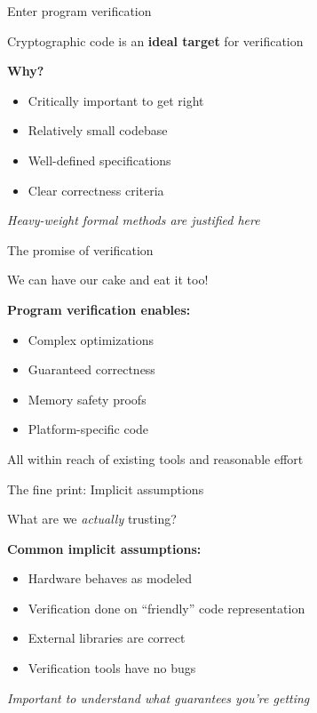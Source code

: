 \documentclass[aspectratio=169, lualatex, handout]{beamer}
\begin{document}
\begin{frame}{Enter program verification}
	\begin{center}
		\Large
		Cryptographic code is an \textbf{ideal target} for verification
	\end{center}
	\vspace{1em}
	\textbf{Why?}
	\begin{itemize}
		\item Critically important to get right
		\item Relatively small codebase
		\item Well-defined specifications
		\item Clear correctness criteria
	\end{itemize}
	\vspace{0.5em}
	\begin{center}
		\textit{Heavy-weight formal methods are justified here}
	\end{center}
\end{frame}

\begin{frame}{The promise of verification}
	\begin{center}
		\Large
		We can have our cake and eat it too!
	\end{center}
	\vspace{1em}
	\textbf{Program verification enables:}
	\begin{itemize}
		\item Complex optimizations
		\item Guaranteed correctness
		\item Memory safety proofs
		\item Platform-specific code
	\end{itemize}
	\vspace{0.5em}
	\begin{center}
		All within reach of existing tools and reasonable effort
	\end{center}
\end{frame}

\begin{frame}{The fine print: Implicit assumptions}
	\begin{center}
		\Large
		What are we \textit{actually} trusting?
	\end{center}
	\vspace{1em}
	\textbf{Common implicit assumptions:}
	\begin{itemize}
		\item Hardware behaves as modeled
		\item Verification done on ``friendly'' code representation
		\item External libraries are correct
		\item Verification tools have no bugs
	\end{itemize}
	\vspace{0.5em}
	\begin{center}
		\textit{Important to understand what guarantees you're getting}
	\end{center}
\end{frame}
\end{document}
